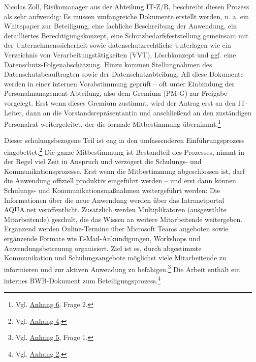 \documentclass[
    12pt, 
    a4paper,
    ]{scrartcl} %
\begin{document}
Nicolas Zoll, Risikomanager aus der Abteilung IT-Z/R, beschreibt diesen Prozess als sehr aufwendig: Es müssen umfangreiche Dokumente erstellt werden, u. a. ein Whitepaper zur Beteiligung, eine fachliche Beschreibung der Anwendung, ein detailliertes Berechtigungskonzept, eine Schutzbedarfsfeststellung gemeinsam mit der Unternehmenssicherheit sowie datenschutzrechtliche Unterlagen wie ein Verzeichnis von Verarbeitungstätigkeiten (VVT), Löschkonzept und ggf. eine Datenschutz-Folgenabschätzung. Hinzu kommen Stellungnahmen des Datenschutzbeauftragten sowie der Datenschutzabteilung. All diese Dokumente werden in einer internen Vorabstimmung geprüft – oft unter Einbindung der Personalmanagement-Abteilung, also dem Gremium (PM-G) zur Freigabe vorgelegt. Erst wenn dieses Gremium zustimmt, wird der Antrag erst an den IT-Leiter, dann an die Vorstandsrepräsentantin und anschließend an den zuständigen Personalrat weitergeleitet, der die formale Mitbestimmung übernimmt.\footnote{Vgl. \hyperref[sec:Anhang6]{Anhang 6}, Frage 2.}

Dieser schulungsbezogene Teil ist eng in den umfassenderen Einführungsprozess eingebettet.\footnote{Vgl. \hyperref[sec:Anhang4]{Anhang 4}.} Die ganze Mitbestimmung ist Bestandteil des Prozesses, nimmt in der Regel viel Zeit in Anspruch und verzögert die Schulungs- und Kommunikationsprozesse. Erst wenn die Mitbestimmung abgeschlossen ist, darf die Anwendung offiziell produktiv eingeführt werden – und erst dann können Schulungs- und Kommunikationsmaßnahmen weitergeführt werden: Die Informationen über die neue Anwendung werden über das Intranetportal AQUA.net veröffentlicht. Zusätzlich werden Multiplikatoren (ausgewählte Mitarbeitende) geschult, die das Wissen an weitere Mitarbeitende weitergeben. Ergänzend werden Online-Termine über Microsoft Teams angeboten sowie ergänzende Formate wie E-Mail-Ankündigungen, Workshops und Anwendungsbetreuung organisiert. Ziel ist es, durch abgestimmte Kommunikation und Schulungsangebote möglichst viele Mitarbeitende zu informieren und zur aktiven Anwendung zu befähigen.\footnote{Vgl. \hyperref[sec:Anhang 5]{Anhang 5}, Frage 1.} Die Arbeit enthält ein internes BWB-Dokument zum Beteiligungsprozess.\footnote{Vgl. \hyperref[sec:Anhang2]{Anhang 2}.}
\end{document}
